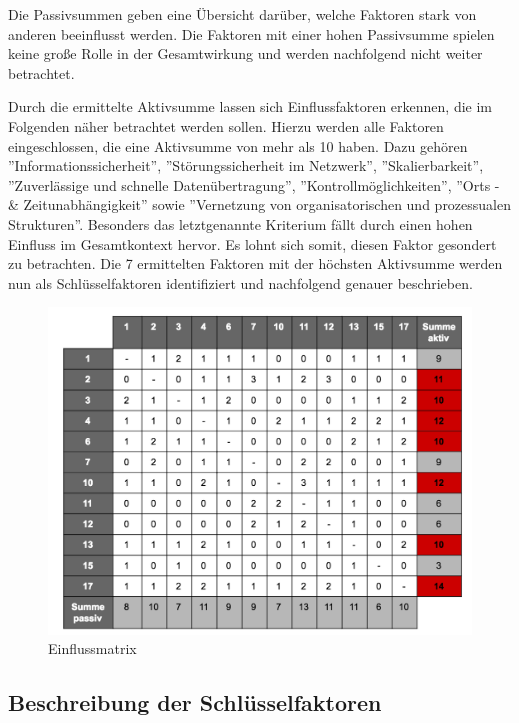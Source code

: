 Die Passivsummen geben eine Übersicht darüber, welche Faktoren stark von anderen beeinflusst werden. Die Faktoren mit einer hohen Passivsumme spielen keine große Rolle in der Gesamtwirkung und werden nachfolgend nicht weiter betrachtet.

Durch die ermittelte Aktivsumme lassen sich Einflussfaktoren erkennen, die im Folgenden näher betrachtet werden sollen. Hierzu werden alle Faktoren eingeschlossen, die eine Aktivsumme von mehr als 10 haben. Dazu gehören ''Informationssicherheit'', ''Störungssicherheit im Netzwerk'', ''Skalierbarkeit'', ''Zuverlässige und schnelle Datenübertragung'', ''Kontrollmöglichkeiten'', ''Orts - \& Zeitunabhängigkeit'' sowie ''Vernetzung von organisatorischen und prozessualen Strukturen''. Besonders das letztgenannte Kriterium fällt durch einen hohen Einfluss im Gesamtkontext hervor. Es lohnt sich somit, diesen Faktor gesondert zu betrachten. Die 7 ermittelten Faktoren mit der höchsten Aktivsumme werden nun als Schlüsselfaktoren identifiziert und nachfolgend genauer beschrieben.

\begin{figure}
	\centering
	\includegraphics[width=\linewidth]{images/matrix}
	\caption[Caption for parameters]{Einflussmatrix}
	\label{fig:matrix}
\end{figure}

\subsection{Beschreibung der Schlüsselfaktoren}

